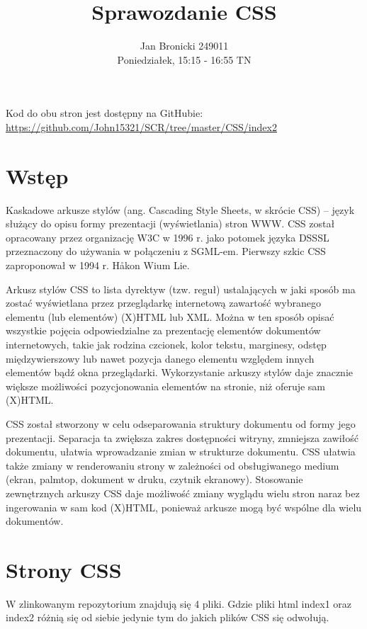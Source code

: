 \documentclass{article}
\title{Sprawozdanie CSS}
\author{Jan Bronicki 249011\\Poniedziałek, 15:15 - 16:55 TN}
\date{}
\begin{document}
\maketitle

\begin{center}
    Kod do obu stron jest dostępny na GitHubie:
    \url{https://github.com/John15321/SCR/tree/master/CSS/index2}
\end{center}

\section{Wstęp}
Kaskadowe arkusze stylów (ang. Cascading Style Sheets, w skrócie CSS) – język służący do opisu formy prezentacji (wyświetlania) stron WWW. CSS został opracowany przez organizację W3C w 1996 r. jako potomek języka DSSSL przeznaczony do używania w połączeniu z SGML-em. Pierwszy szkic CSS zaproponował w 1994 r. Håkon Wium Lie.

Arkusz stylów CSS to lista dyrektyw (tzw. reguł) ustalających w jaki sposób ma zostać wyświetlana przez przeglądarkę internetową zawartość wybranego elementu (lub elementów) (X)HTML lub XML. Można w ten sposób opisać wszystkie pojęcia odpowiedzialne za prezentację elementów dokumentów internetowych, takie jak rodzina czcionek, kolor tekstu, marginesy, odstęp międzywierszowy lub nawet pozycja danego elementu względem innych elementów bądź okna przeglądarki. Wykorzystanie arkuszy stylów daje znacznie większe możliwości pozycjonowania elementów na stronie, niż oferuje sam (X)HTML.

CSS został stworzony w celu odseparowania struktury dokumentu od formy jego prezentacji. Separacja ta zwiększa zakres dostępności witryny, zmniejsza zawiłość dokumentu, ułatwia wprowadzanie zmian w strukturze dokumentu. CSS ułatwia także zmiany w renderowaniu strony w zależności od obsługiwanego medium (ekran, palmtop, dokument w druku, czytnik ekranowy). Stosowanie zewnętrznych arkuszy CSS daje możliwość zmiany wyglądu wielu stron naraz bez ingerowania w sam kod (X)HTML, ponieważ arkusze mogą być wspólne dla wielu dokumentów.


\section{Strony CSS}
W zlinkowanym repozytorium znajdują się 4 pliki. Gdzie pliki html index1 oraz index2 różnią się od siebie jedynie tym do jakich plików CSS się odwołują.

\newpage
\end{document}
